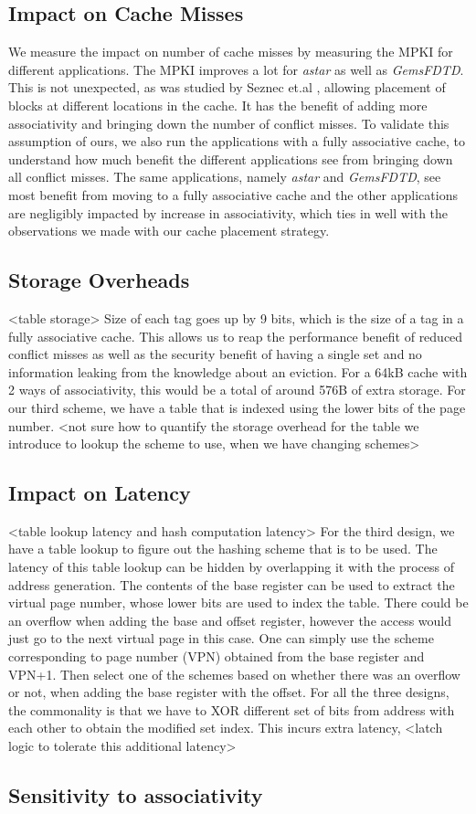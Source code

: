 \subsection {Impact on Cache Misses}
We measure the impact on number of cache misses by measuring the MPKI  for different applications. The MPKI improves a lot for \textit{astar} as well as \textit{GemsFDTD}. This is not unexpected, as was studied by Seznec et.al \cite{seznec1993case}, allowing placement of blocks at different locations in the cache. It has the benefit of adding more associativity and bringing down the number of conflict misses. To validate this assumption of ours, we also run the applications with a fully associative cache, to understand how much benefit the different applications see from bringing down all conflict misses. The same applications, namely \textit{astar} and \textit{GemsFDTD}, see most benefit from moving to a fully associative cache and the other applications are negligibly impacted by increase in associativity, which ties in well with the observations we made with our cache placement strategy.   
\subsection {Storage Overheads} <table storage>
Size of each tag goes up by 9 bits, which is the size of a tag in a fully associative cache. This allows us to reap the performance benefit of reduced conflict misses as well as the security benefit of having a single set and no information leaking from the knowledge about an eviction. For a 64kB cache with 2 ways of associativity, this would be a total of around 576B of extra storage.    
For our third scheme, we have a table that is indexed using the lower bits of the page number. <not sure how to quantify the storage overhead for the table we introduce to lookup the scheme to use, when we have changing schemes> 
\subsection {Impact on Latency} <table lookup latency and hash computation latency>
For the third design, we have a table lookup to figure out the hashing scheme that is to be used. The latency of this table lookup can be hidden by overlapping it with the process of address generation. The contents of the base register can be used to extract the virtual page number, whose lower bits are used to index the table. There could be an overflow when adding the base and offset register, however the access would just go to the next virtual page in this case. One can simply use the scheme corresponding to page number (VPN) obtained from the base register and VPN+1. Then select one of the schemes based on whether there was an overflow or not, when adding the base register with the offset.
For all the three designs, the commonality is that we have to XOR different set of bits from address with each other to obtain the modified set index. This incurs extra latency, <latch logic to tolerate this additional latency> 
\subsection{Sensitivity to associativity}

